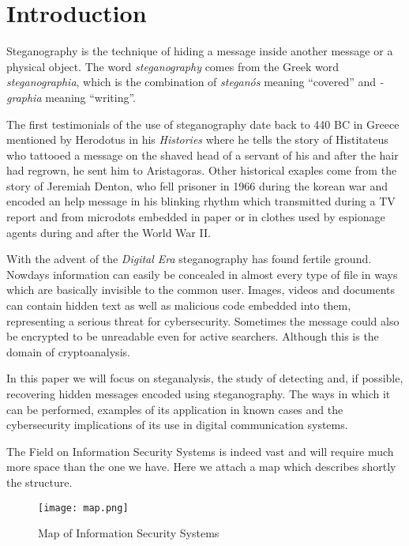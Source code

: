 \documentclass[../../main.tex]{subfiles}
\begin{document}
\section{Introduction}

Steganography is the technique of hiding a message inside another message or a
physical object.\cite{steganography-definition}
The word \emph{steganography} comes from the Greek word
\emph{steganographia}, which is the combination of \emph{steganós} meaning
``covered'' and \emph{-graphia} meaning ``writing''.

The first testimonials of the use of steganography date back to 440 BC in Greece
mentioned by Herodotus in his \emph{Histories} where he tells the story of Histitateus who tattooed a message on the shaved head of a servant of his
and after the hair had regrown, he sent him to Aristagoras.
Other historical exaples come from the story of Jeremiah Denton, who fell prisoner in 1966 during the korean
war and encoded an help message in his blinking rhythm which transmitted during a TV report and from microdots
embedded in paper or in clothes used by espionage agents during and after the
World War II.

With the advent of the \emph{Digital Era} steganography has found fertile ground. Nowdays information can easily
be concealed in almost every type of file in ways which are basically invisible to the common user. Images, videos and documents 
can contain hidden text as well as malicious code embedded into them, representing a serious threat for cybersecurity. 
Sometimes the message could also be encrypted to be unreadable even for active searchers. Although this is the domain of cryptoanalysis. 

In this paper we will focus on steganalysis, the study of detecting and, if
possible, recovering hidden messages encoded using steganography. The ways in
which it can be performed, examples of its application in known cases and
the cybersecurity implications of its use in digital communication systems.

The Field on Information Security Systems is indeed vast and will require much
more space than the one we have. Here we attach a map which describes shortly
the structure.

\begin{figure}[h]
    \centering
    \caption{Map of Information Security Systems \cite{modern-text-hiding}}
    \texttt{[image: map.png]}
\end{figure}
\end{document}
